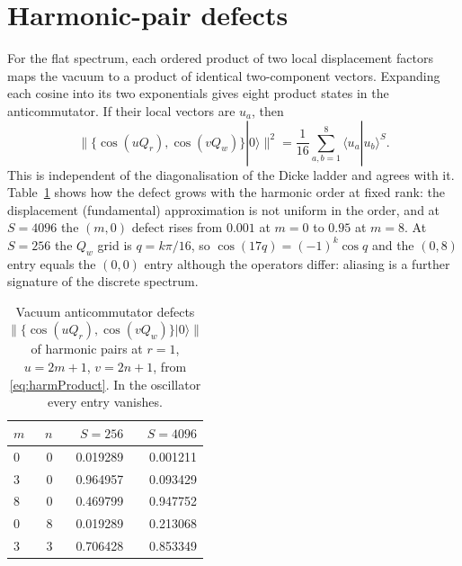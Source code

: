 \documentclass[11pt,a4paper]{article}
\newcommand{\ket}[1]{|#1\rangle}
\begin{document}
\section{Harmonic-pair defects}
\label{app:harmonics}
For the flat spectrum, each ordered product of two local displacement factors maps the vacuum to a product of identical two-component vectors. Expanding each cosine into its two exponentials gives eight product states in the anticommutator. If their local vectors are $u_a$, then
\begin{equation}
\big\|\{\cos(uQ_r),\cos(vQ_w)\}\ket0\big\|^2
=\frac1{16}\sum_{a,b=1}^{8}\langle u_a|u_b\rangle^S.
\label{eq:harmProduct}
\end{equation}
This is independent of the diagonalisation of the Dicke ladder and agrees with it. Table~\ref{tab:harm} shows how the defect grows with the harmonic order at fixed rank: the displacement (fundamental) approximation is not uniform in the order, and at $S=4096$ the $(m,0)$ defect rises from $0.001$ at $m=0$ to $0.95$ at $m=8$. At $S=256$ the $Q_w$ grid is $q=k\pi/16$, so $\cos(17q)=(-1)^k\cos q$ and the $(0,8)$ entry equals the $(0,0)$ entry although the operators differ: aliasing is a further signature of the discrete spectrum.
\begin{table}[h]
\centering\small
\begin{tabular}{lrrr}
\toprule
$m$ & $n$ & $S=256$ & $S=4096$\\
\midrule
0 & 0 & 0.019289 & 0.001211\\
3 & 0 & 0.964957 & 0.093429\\
8 & 0 & 0.469799 & 0.947752\\
0 & 8 & 0.019289 & 0.213068\\
3 & 3 & 0.706428 & 0.853349\\
\bottomrule
\end{tabular}
\caption{Vacuum anticommutator defects $\|\{\cos(uQ_r),\cos(vQ_w)\}\ket0\|$ of harmonic pairs at $r=1$, $u=2m+1$, $v=2n+1$, from \eqref{eq:harmProduct}. In the oscillator every entry vanishes.}
\label{tab:harm}
\end{table}
\end{document}
